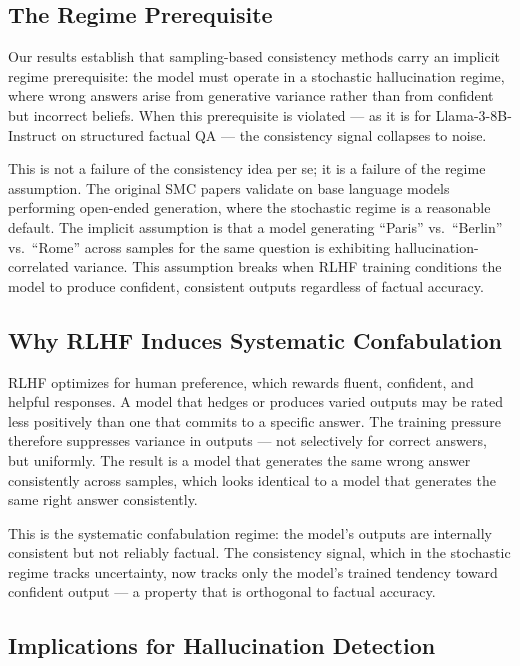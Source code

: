 \subsection{The Regime Prerequisite}

Our results establish that sampling-based consistency methods carry an implicit regime prerequisite: the model must operate in a stochastic hallucination regime, where wrong answers arise from generative variance rather than from confident but incorrect beliefs. When this prerequisite is violated --- as it is for Llama-3-8B-Instruct on structured factual QA --- the consistency signal collapses to noise.

This is not a failure of the consistency idea per se; it is a failure of the regime assumption. The original SMC papers \cite{Kuhn2023Semantic,Manakul2023SelfCheckGPT} validate on base language models performing open-ended generation, where the stochastic regime is a reasonable default. The implicit assumption is that a model generating ``Paris'' vs.\ ``Berlin'' vs.\ ``Rome'' across samples for the same question is exhibiting hallucination-correlated variance. This assumption breaks when RLHF training \cite{Ouyang2022Training} conditions the model to produce confident, consistent outputs regardless of factual accuracy.

\subsection{Why RLHF Induces Systematic Confabulation}

RLHF optimizes for human preference, which rewards fluent, confident, and helpful responses. A model that hedges or produces varied outputs may be rated less positively than one that commits to a specific answer. The training pressure therefore suppresses variance in outputs --- not selectively for correct answers, but uniformly. The result is a model that generates the same wrong answer consistently across samples, which looks identical to a model that generates the same right answer consistently.

This is the systematic confabulation regime: the model's outputs are internally consistent but not reliably factual. The consistency signal, which in the stochastic regime tracks uncertainty, now tracks only the model's trained tendency toward confident output --- a property that is orthogonal to factual accuracy.

\subsection{Implications for Hallucination Detection}

